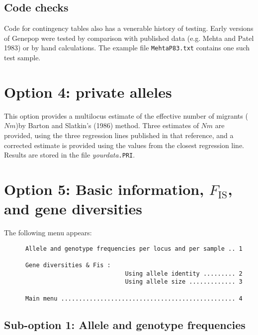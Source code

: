 \documentclass[12pt,]{book}
\begin{document}
\subsection{Code checks}\label{code-checks-2}

 Code for contingency tables also has a venerable
history of testing. Early versions of Genepop were tested by comparison
with published data (e.g. Mehta and Patel 1983) or by hand calculations.
The example file \texttt{MehtaP83.txt} contains one such test sample.

\section{Option 4: private alleles}\label{option-4-private-alleles}

This option provides a multilocus estimate of the effective number of
migrants (\(Nm\))by Barton and Slatkin's (1986) method. Three estimates
of \(Nm\) are provided, using the three regression lines published in
that reference, and a corrected estimate is provided using the values
from the closest regression line. Results are stored in the file
\emph{yourdata}\texttt{.PRI}.

\section{\texorpdfstring{Option 5: Basic information, \(F_\mathrm{IS}\),
and gene
diversities}{Option 5: Basic information, F\_\textbackslash{}mathrm\{IS\}, and gene diversities}}\label{option-5-basic-information-f_mathrmis-and-gene-diversities}

The following menu appears:

\begin{verbatim}
      Allele and genotype frequencies per locus and per sample .. 1

      Gene diversities & Fis :
                                  Using allele identity ......... 2
                                  Using allele size ............. 3

      Main menu ................................................. 4
\end{verbatim}

\subsection{Sub-option 1: Allele and genotype
frequencies}\label{sub-option-1-allele-and-genotype-frequencies}
\end{document}

